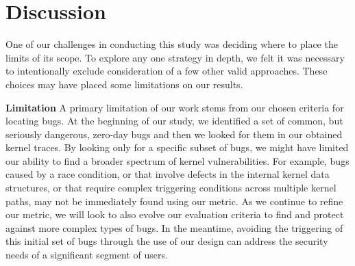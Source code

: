 \section{Discussion}
\label{sec.limitation}

One of our challenges in conducting this study was deciding where to place the
limits of its scope.  To explore any one strategy
in depth, we felt it was necessary to intentionally exclude consideration of
a few other valid approaches. These choices may have placed some limitations on our results.

\textbf{Limitation }
A primary limitation of our work stems from our chosen criteria for locating
bugs. At the beginning
of our study, we identified a set of common, but seriously dangerous, zero-day bugs
and then we looked for them in our obtained kernel traces. By looking only
for a specific subset of bugs, we might have limited our
ability to find a broader spectrum of kernel vulnerabilities. For example, bugs
caused by a race condition, or that involve defects in the internal kernel data
structures, or that require complex triggering conditions across multiple kernel
paths, may not be immediately found using our metric. As we continue to refine
our metric, we will look to also evolve our evaluation
criteria to find and protect against more complex types of bugs.
In the meantime, avoiding the triggering of this initial set of bugs
through the use of our \lip design can address the security
needs of a significant segment of users.


